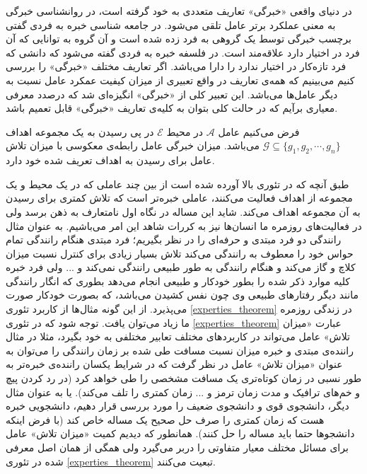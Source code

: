 در دنیای واقعی «خبرگی» تعاریف متعددی به خود گرفته است، در روانشناسی خبرگی به معنی عملکرد برتر عامل تلقی می‌شود. در جامعه شناسی خبره به فردی گفتی برچسب خبرگی توسط یک گروهی به فرد زده شده است و آن گروه به توانایی که آن فرد در اختیار دارد علاقه‌مند است. در فلسفه خبره به فردی گفته می‌شود که دانشی که فرد تازه‌کار در اختیار ندارد را دارا می‌باشد. اگر تعاریف مختلف «خبرگی» را بررسی کنیم می‌بینیم که همه‌ی تعاریف در واقع تعبیری از میزان کیفیت عمکرد عامل نسبت به دیگر عامل‌ها می‌باشد. این تعبیر کلی از «خبرگی» انگیزه‌ای شد که درصدد معرفی معیاری برآیم که در حالت کلی بتوان به کلیه‌ی تعاریف «خبرگی» قابل تعمیم باشد.

\begin{theorem}[خبرگی]\setstretch{\thebaselinestretch}\label{experties_theorem}
فرض می‌کنیم عامل $\mathcal{A}$ در محیط $\mathcal{E}$ در پی رسیدن به یک مجموعه اهداف 
$\mathcal{G} \subseteq \{g_1, g_2, \cdots, g_n\}$
می‌باشد. میزان خبرگی عامل رابطه‌ی معکوسی با میزان تلاش عامل برای رسیدن به اهداف تعریف شده خود دارد.
\end{theorem}

طبق آنچه که در تئوری بالا آورده شده است از بین چند عاملی که در یک محیط و یک مجموعه از اهداف فعالیت می‌کنند، عاملی خبره‌تر است که تلاش کمتری برای رسیدن به آن مجموعه اهداف می‌کند. شاید این مساله در نگاه اول نامتعارف به ذهن برسد ولی در فعالیت‌های روزمره ما انسان‌ها نیز به کررات شاهد این امر می‌باشیم. به عنوان مثال رانندگی دو فرد مبتدی و حرفه‌ای را در نظر بگیریم؛ فرد مبتدی هنگام رانندگی تمام حواس خود را معطوف به رانندگی می‌کند تلاش بسیار زیادی برای کنترل نسبت میزان کلاچ و گاز می‌کند و هنگام رانندگی به طور طبیعی رانندگی نمی‌کند و ... ولی فرد خبره کلیه موارد ذکر شده را بطور خودکار و طبیعی انجام می‌دهد بطوری که انگار رانندگی مانند دیگر رفتارهای طبیعی وی چون نفس کشیدن می‌باشد، که بصورت خودکار صورت می‌پذیرد. از این گونه مثال‌ها از کاربرد تئوری
\ref{experties_theorem}
در زندگی روزمره ما زیاد می‌توان یافت.
توجه شود که در تئوری
\ref{experties_theorem}
عبارت «میزان تلاش» عامل می‌تواند در کاربردهای مختلف تعابیر مختلفی به خود بگیرد، مثلا در مثال راننده‌ی مبتدی و خبره میزان نسبت مسافت طی شده بر زمان رانندگی را می‌توان به عنوان «میزان تلاش» عامل در نظر گرفت که در شرایط یکسان راننده‌ی خبره‌تر به طور نسبی در زمان کوتاه‌تری یک مسافت مشخصی را طی خواهد کرد (در رد کردن پیچ و خم‌های ترافیک و مدت زمان ترمز و ... زمان کمتری را تلف می‌کند). یا به عنوان مثال دیگر، دانشجوی قوی و دانشجوی ضعیف را مورد بررسی قرار دهیم، دانشجویی خبره هست که زمان کمتری را صرف حل صحیح یک مساله خاص کند (با فرض اینکه دانشجوها حتما باید مساله را حل کنند). همانطور که دیدیم کمیت «میزان تلاش» عامل برای مسائل مختلف معیار متفاوتی را دربر می‌گیرد ولی همگی از همان اصل معرفی شده در تئوری
\ref{experties_theorem}
تبعیت می‌کنند.

